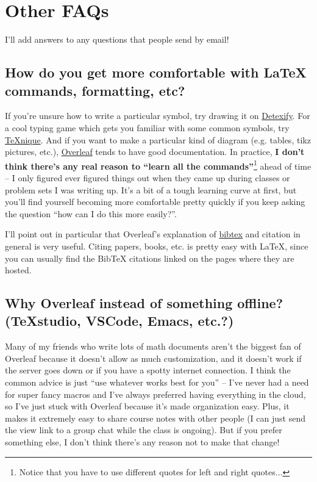 \documentclass[11pt]{article}
\begin{document}
\section{Other FAQs}

I'll add answers to any questions that people send by email! 

\subsection*{How do you get more comfortable with LaTeX commands, formatting, etc?}

If you're unsure how to write a particular symbol, try drawing it on \href{https://detexify.kirelabs.org/classify.html}{Detexify}. For a cool typing game which gets you familiar with some common symbols, try \href{https://texnique.xyz/}{TeXnique}. And if you want to make a particular kind of diagram (e.g. tables, tikz pictures, etc.), \href{https://www.overleaf.com/learn}{Overleaf} tends to have good documentation. In practice, \textbf{I don't think there's any real reason to ``learn all the commands''}\footnote{Notice that you have to use different quotes for left and right quotes...} ahead of time -- I only figured ever figured things out when they came up during classes or problem sets I was writing up. It's a bit of a tough learning curve at first, but you'll find yourself becoming more comfortable pretty quickly if you keep asking the question ``how can I do this more easily?''.

I'll point out in particular that Overleaf's explanation of \href{https://www.overleaf.com/learn/latex/Bibliography_management_with_bibtex}{bibtex} and citation in general is very useful. Citing papers, books, etc. is pretty easy with LaTeX, since you can usually find the BibTeX citations linked on the pages where they are hosted.

\subsection*{Why Overleaf instead of something offline? (TeXstudio, VSCode, Emacs, etc.?)}
Many of my friends who write lots of math documents aren't the biggest fan of Overleaf because it doesn't allow as much customization, and it doesn't work if the server goes down or if you have a spotty internet connection. I think the common advice is just ``use whatever works best for you'' -- I've never had a need for super fancy macros and I've always preferred having everything in the cloud, so I've just stuck with Overleaf because it's made organization easy. Plus, it makes it extremely easy to share course notes with other people (I can just send the view link to a group chat while the class is ongoing). But if you prefer something else, I don't think there's any reason not to make that change! 
\end{document}
